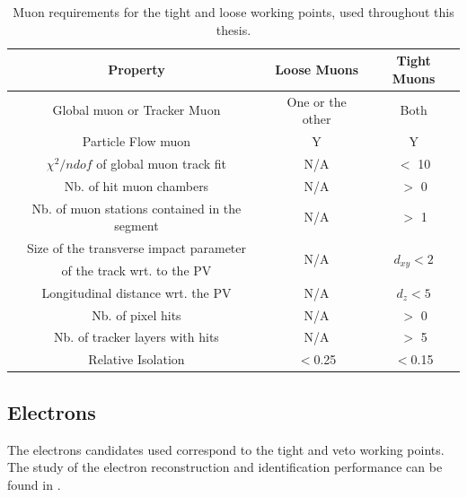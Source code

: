 \begin{table}[htbp]
	\centering
	\caption{Muon requirements for the tight and loose working points, used throughout this thesis.}
	\begin{tabular}{ccc}
		\toprule
		Property & Loose Muons & Tight Muons \\ 
		\midrule 
		Global muon or Tracker Muon & One or the other & Both \\ 
	
		Particle Flow muon & Y & Y \\ 
		
		$\chi^2/ndof$ of global muon track fit & N/A & $<$ 10 \\ 
	
		Nb. of hit muon chambers & N/A & $>$ 0 \\ 
		
		Nb. of muon stations contained in the segment & N/A & $>$ 1  \\ 
		
		 Size of the transverse impact parameter  & \multirow{2}{*}{N/A }& \multirow{2}{*}{$d_{xy} < 2$ \mm} \\ 
	 of the track wrt. to the PV & & \\
		Longitudinal distance wrt. the PV & N/A & $d_z < 5$ \mm \\ 
		
		Nb. of pixel hits & N/A & $>$ 0 \\ 
		
		Nb. of tracker layers with hits & N/A & $>$ 5 \\ 
	
		Relative Isolation & $<$0.25 & $<$0.15 \\
		\bottomrule
	\end{tabular} 
	
	\label{tab:MuonReq}
\end{table}


\newpage
\subsection{Electrons}
\label{sec:ElectronID}
The electrons candidates used correspond to the tight and veto working points.  The study of the electron reconstruction and identification performance can be found in \cite{CMS-DP-2017-004}.

